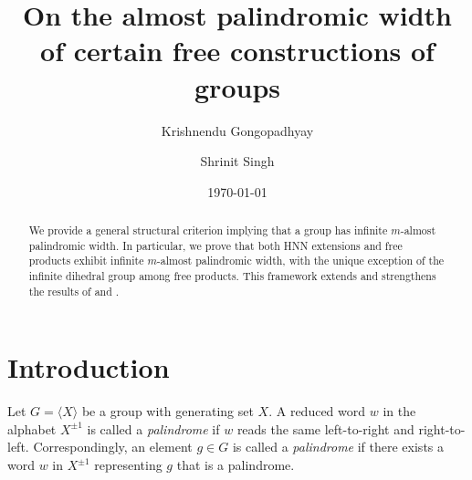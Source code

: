 \documentclass[12pt]{amsart}
\theoremstyle{definition}
\theoremstyle{remark}
\numberwithin{equation}{subsection}
\theoremstyle{plain}
\numberwithin{equation}{section}
\begin{document}
\title[ On the almost palindromic width]{On the almost palindromic width of certain free constructions of groups} 
\author{Krishnendu Gongopadhyay}
\address{Department of Mathematical Sciences, Indian Institute of Science Education and Research (IISER) Mohali,
Knowledge City, Sector 81, S.A.S. Nagar, P.O. Manauli 140306, India}
\author{Shrinit Singh}
\address{International Center for Theoretical Sciences, Survey No. 151, Shivakote,
Hesaraghatta Hobli,
Bengaluru - 560089 }



\date{\today}





\begin{abstract}
We provide a general structural criterion implying that a group has infinite $m$-almost palindromic width. In particular, we prove that both HNN extensions and free products exhibit infinite $m$-almost palindromic width, with the unique exception of the infinite dihedral group among free products. This framework extends and strengthens the results of \cite{MS} and \cite{GK}.
\end{abstract}
\maketitle
\section{Introduction}
Let $G=\langle X \rangle$ be a group with generating set $X$.   A reduced word $w$ in the
alphabet $X^{\pm 1}$ is called a {\it palindrome} if $w$ reads the same
left-to-right and right-to-left. Correspondingly, an element $g \in G$ is called a
\emph{palindrome} if there exists a word $w$ in $X^{\pm 1}$ representing $g$ that is a palindrome. 
\end{document}
